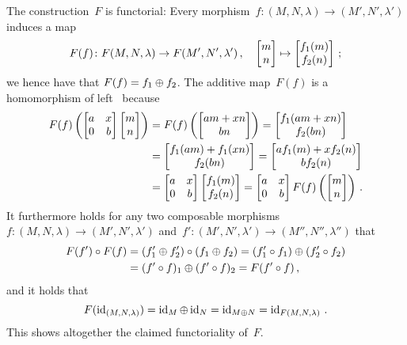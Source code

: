 The construction~$F$ is functorial:
Every morphism~$f \colon (M, N, \lambda) \to (M', N', \lambda')$ induces a map
\[
          F(f)
  \colon  F(M,N,\lambda)
  \to     F(M',N',\lambda') \,,
  \quad   \begin{bmatrix} m \\ n \end{bmatrix}
  \mapsto \begin{bmatrix} f_1(m) \\ f_2(n) \end{bmatrix} \,;
\]
we hence have that $F(f) = f_1 \oplus f_2$.
The additive map~$F(f)$ is a homomorphism of left~{} because
\begin{align*}
  F(f)
  \left(
    \begin{bmatrix}
      a & x \\
      0 & b
    \end{bmatrix}
    \begin{bmatrix} m \\ n \end{bmatrix}
  \right)
  &=
  F(f)
  \left(
    \begin{bmatrix}  am + xn \\ bn  \end{bmatrix}
  \right)
  =
  \begin{bmatrix}  f_1(am + xn) \\ f_2(bn)  \end{bmatrix}
  \\
  &=
  \begin{bmatrix}  f_1(am) + f_1(xn) \\ f_2(bn)  \end{bmatrix}
  =
  \begin{bmatrix}  a f_1(m) + x f_2(n) \\ b f_2(n)  \end{bmatrix}
  \\
  &=
  \begin{bmatrix}
    a & x \\
    0 & b
  \end{bmatrix}
  \begin{bmatrix}  f_1(m) \\ f_2(n)  \end{bmatrix}
  =
  \begin{bmatrix}
    a & x \\
    0 & b
  \end{bmatrix}
  F(f)
  \left(
    \begin{bmatrix} m \\ n \end{bmatrix}
  \right) \,.
\end{align*}
It furthermore holds for any two composable morphisms~$f \colon (M, N, \lambda) \to (M', N', \lambda')$ and~$f' \colon (M', N', \lambda') \to (M'', N'', \lambda'')$ that
\begin{align*}
      F(f') \circ F(f)
  &=  (f'_1 \oplus f'_2) \circ (f_1 \oplus f_2)
   =  (f'_1 \circ f_1) \oplus (f'_2 \circ f_2) \\
  &=  (f' \circ f)_1 \oplus (f' \circ f)_2
   =  F(f' \circ f) \,,
\end{align*}
and it holds that
\[
  F(\operatorname{id}_{(M, N, \lambda)})
  =
  \operatorname{id}_M \oplus \operatorname{id}_N
  =
  \operatorname{id}_{M \oplus N}
  =
  \operatorname{id}_{F(M, N, \lambda)} \,.
\]
This shows altogether the claimed functoriality of~$F$.




















